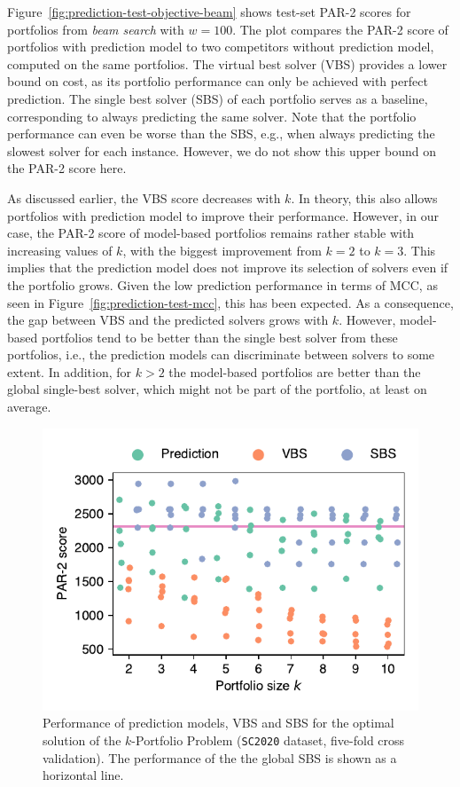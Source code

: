 \documentclass[runningheads]{llncs}
\begin{document}
Figure~\ref{fig:prediction-test-objective-beam} shows test-set PAR-2 scores for portfolios from \emph{beam search} with $w=100$.
The plot compares the PAR-2 score of portfolios with prediction model to two competitors without prediction model, computed on the same portfolios.
The virtual best solver (VBS) provides a lower bound on cost, as its portfolio performance can only be achieved with perfect prediction.
The single best solver (SBS) of each portfolio serves as a baseline, corresponding to always predicting the same solver.
Note that the portfolio performance can even be worse than the SBS, e.g., when always predicting the slowest solver for each instance.
However, we do not show this upper bound on the PAR-2 score here.

As discussed earlier, the VBS score decreases with $k$.
In theory, this also allows portfolios with prediction model to improve their performance.
However, in our case, the \mbox{PAR-2} score of model-based portfolios remains rather stable with increasing values of $k$, with the biggest improvement from $k=2$ to $k=3$.
This implies that the prediction model does not improve its selection of solvers even if the portfolio grows.
Given the low prediction performance in terms of MCC, as seen in Figure~\ref{fig:prediction-test-mcc}, this has been expected.
As a consequence, the gap between VBS and the predicted solvers grows with $k$.
However, model-based portfolios tend to be better than the single best solver from these portfolios, i.e., the prediction models can discriminate between solvers to some extent.
In addition, for $k > 2$ the model-based portfolios are better than the global single-best solver, which might not be part of the portfolio, at least on average.

\begin{figure}[htb]
	\centering
	\includegraphics[width=0.5\columnwidth, trim=0 15 0 10, clip]{plots/prediction-test-objective-optimal-2020.pdf}
	\caption{
		Performance of prediction models, VBS and SBS for the optimal solution of the $k$-Portfolio Problem (\texttt{SC2020} dataset, five-fold cross validation). 
		The performance of the the global SBS is shown as a horizontal line.
	}
	\label{fig:prediction-test-objective-optimal-2020}
\end{figure}
\end{document}
